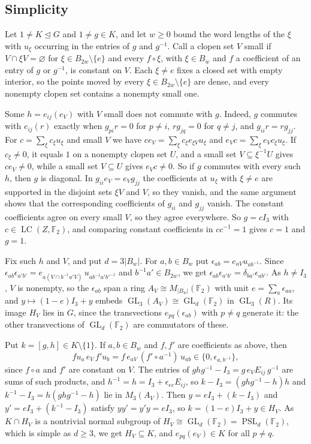 \documentclass[11pt]{amsart}
\newcommand{\F}{\mathbb F}
\newcommand{\LC}{\operatorname{LC}}
\newcommand{\GL}{\operatorname{GL}}
\newcommand{\PSL}{\operatorname{PSL}}
\begin{document}
\subsection*{Simplicity}
Let $1\ne K\trianglelefteq G$ and $1\ne g\in K$, and let $w\ge0$ bound the
word lengths of the $\xi$ with $u_\xi$ occurring in the entries of $g$ and
$g^{-1}$. Call a clopen set $V$ small if $V\cap\xi V=\varnothing$ for
$\xi\in B_{2w}\setminus\{e\}$ and every $f\circ\xi$, with $\xi\in B_w$ and
$f$ a coefficient of an entry of $g$ or $g^{-1}$, is constant on $V$.
Each $\xi\ne e$ fixes a closed set with empty interior, so the points
moved by every $\xi\in B_{2w}\setminus\{e\}$ are dense, and every nonempty
clopen set contains a nonempty small one.

Some $h=e_{ij}(e_V)$ with $V$ small does not commute with $g$. Indeed, $g$
commutes with $e_{ij}(r)$ exactly when $g_{pi}r=0$ for $p\ne i$,
$rg_{jq}=0$ for $q\ne j$, and $g_{ii}r=rg_{jj}$. For $c=\sum_\xi c_\xi u_\xi$
and small $V$ we have $ce_V=\sum_\xi c_\xi e_{\xi V}u_\xi$ and
$e_Vc=\sum_\xi e_Vc_\xi u_\xi$. If $c_\xi\ne0$, it equals $1$ on a nonempty
clopen set $U$, and a small set $V\subseteq\xi^{-1}U$ gives $ce_V\ne0$,
while a small set $V\subseteq U$ gives $e_Vc\ne0$. So if $g$ commutes with
every such $h$, then $g$ is diagonal. In $g_{ii}e_V=e_Vg_{jj}$ the
coefficients at $u_\xi$ with $\xi\ne e$ are supported in the disjoint sets
$\xi V$ and $V$, so they vanish, and the same argument shows that the
corresponding coefficients of $g_{ii}$ and $g_{jj}$ vanish. The constant
coefficients agree on every small $V$, so they agree everywhere. So
$g=cI_3$ with $c\in\LC(Z,\F_2)$, and comparing constant coefficients in
$cc^{-1}=1$ gives $c=1$ and $g=1$.

Fix such $h$ and $V$, and put $d=3|B_w|$. For $a,b\in B_w$ put
$\epsilon_{ab}=e_{aV}u_{ab^{-1}}$. Since
$\epsilon_{ab}\epsilon_{a'b'}=e_{a(V\cap b^{-1}a'V)}\,u_{ab^{-1}a'b'^{-1}}$
and $b^{-1}a'\in B_{2w}$, we get
$\epsilon_{ab}\epsilon_{a'b'}=\delta_{ba'}\epsilon_{ab'}$. As $h\ne I_3$,
$V$ is nonempty, so the $\epsilon_{ab}$ span a ring
$A_V\cong M_{|B_w|}(\F_2)$ with unit $e=\sum_a\epsilon_{aa}$, and
$y\mapsto(1-e)I_3+y$ embeds $\GL_3(A_V)\cong\GL_d(\F_2)$ in $\GL_3(R)$. Its
image $H_V$ lies in $G$, since the transvections $e_{pq}(\epsilon_{ab})$
with $p\ne q$ generate it: the other transvections of $\GL_d(\F_2)$ are
commutators of these.

Put $k=[g,h]\in K\setminus\{1\}$. If $a,b\in B_w$ and $f,f'$ are
coefficients as above, then
\[
  fu_a\,e_V\,f'u_b=f\,e_{aV}\,(f'\circ a^{-1})\,u_{ab}
  \in\{0,\epsilon_{a,b^{-1}}\},
\]
since $f\circ a$ and $f'$ are constant on $V$. The entries of
$ghg^{-1}-I_3=g\,e_VE_{ij}\,g^{-1}$ are sums of such products, and
$h^{-1}=h=I_3+\epsilon_{ee}E_{ij}$, so $k-I_3=(ghg^{-1}-h)h$ and
$k^{-1}-I_3=h(ghg^{-1}-h)$ lie in $M_3(A_V)$. Then $y=eI_3+(k-I_3)$ and
$y'=eI_3+(k^{-1}-I_3)$ satisfy $yy'=y'y=eI_3$, so $k=(1-e)I_3+y\in H_V$.
As $K\cap H_V$ is a nontrivial normal subgroup of
$H_V\cong\GL_d(\F_2)=\PSL_d(\F_2)$, which is simple as $d\ge3$, we get
$H_V\subseteq K$, and $e_{pq}(e_V)\in K$ for all $p\ne q$.
\end{document}
